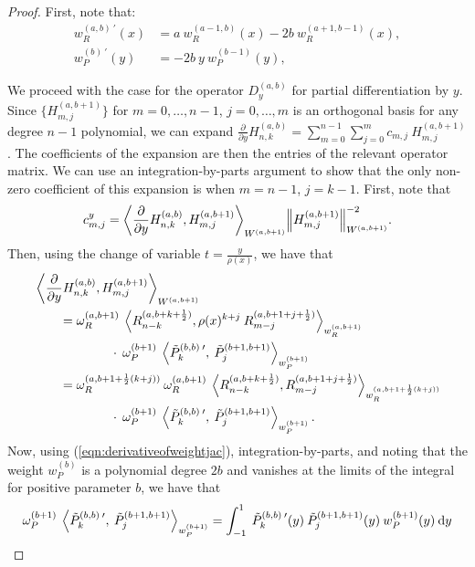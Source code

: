 \documentclass[11pt, oneside]{article}   	%
\newcommand{\half}{\frac{1}{2}}
\newcommand{\pddy}{\frac{\partial}{\partial y}}
\newcommand{\hdop}{H}
\newcommand{\hdopnkab}{\hdop_{n,k}^{(a,b)}}
\newcommand{\jac}{{\tilde P}}
\newcommand{\genjac}{R}
\newcommand{\genjacnmk}{\genjac_{n-k}}
\newcommand{\genjacmmj}{\genjac_{m-j}}
\newcommand{\genjacw}{w_\genjac}
\newcommand{\jacw}{w_P}
\newcommand{\normgenjac}{\omega_\genjac}
\newcommand{\normjac}{\omega_P}
\begin{document}
\begin{proof}
First, note that:
\begin{align}
	\genjacw^{(a,b) \: \prime}(x) &= a \: \genjacw^{(a-1,b)}(x) - 2b \: \genjacw^{(a+1,b-1)}(x), \label{eqn:derivativeofweightgenjac} \\
	\jacw^{(b) \: \prime}(y) &= - 2b \: y \: \jacw^{(b-1)}(y), \label{eqn:derivativeofweightjac}
\end{align}

We proceed with the case for the operator $D_y^{(a,b)}$ for partial differentiation by $y$. Since $\{\hdop^{(a, b+1)}_{m,j}\}$ for $m = 0,\dots,n-1$, $j = 0,\dots,m$ is an orthogonal basis for any degree $n-1$ polynomial, we can expand $\pddy \hdopnkab = \sum_{m=0}^{n-1} \sum_{j=0}^m c_{m,j} \: \hdop^{(a, b+1)}_{m,j}$. The coefficients of the expansion are then the entries of the relevant operator matrix. We can use an integration-by-parts argument to show that the only non-zero coefficient of this expansion is when $m = n-1$, $j = k-1$. First, note that
\begin{align*}
	c_{m,j}^y = {\ip<\pddy \hdopnkab, \hdop^{(a, b+1)}_{m,j} >_{W^{(a, b+1)}}}{\norm{\hdop^{(a, b+1)}_{m,j}}^{-2}_{W^{(a, b+1)}}}.
\end{align*}
Then, using the change of variable $t = \frac{y}{\rho(x)}$, we have that
\begin{align*}
	&\ip<\pddy \hdopnkab, \hdop^{(a, b+1)}_{m,j} >_{W^{(a, b+1)}} \\
	&\quad \quad = \normgenjac^{(a, b+1)} \: \ip< \genjacnmk^{(a,b+k+\half)}, \rho(x)^{k+j} \: \genjacmmj^{(a,b+1+j+\half)} >_{\genjacw^{(a,b+1)}} \\
	&\quad \quad \quad \quad \quad \quad \cdot \: \normjac^{(b+1)} \: \ip< \jac_k^{(b,b) \: \prime}, \: \jac_{j}^{(b+1,b+1)} >_{\jacw^{(b+1)}} \\
	&\quad \quad = \normgenjac^{(a, b+1+\half(k+j))} \: \normgenjac^{(a, b+1)} \: \ip< \genjacnmk^{(a,b+k+\half)}, \genjacmmj^{(a,b+1+j+\half)} >_{\genjacw^{(a,b+1+\half(k+j))}} \\
		&\quad \quad \quad \quad \quad \quad \cdot \: \normjac^{(b+1)} \: \ip< \jac_k^{(b,b) \: \prime}, \: \jac_{j}^{(b+1,b+1)} >_{\jacw^{(b+1)}}.
\end{align*}
Now, using (\ref{eqn:derivativeofweightjac}), integration-by-parts, and noting that the weight $\jacw^{(b)}$ is a polynomial degree $2b$ and vanishes at the limits of the integral for positive parameter $b$, we have that
\begin{align*}
	\normjac^{(b+1)} \: \ip< \jac_k^{(b,b) \: \prime}, \: \jac_{j}^{(b+1,b+1)} >_{\jacw^{(b+1)}} &= \int_{-1}^1 \: \jac_k^{(b,b) \: \prime}(y) \: \jac_{j}^{(b+1,b+1)}(y) \: \jacw^{(b+1)}(y) \: \D y \\

\end{align*}
\end{proof}
\end{document}
